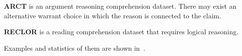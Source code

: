 \textbf{ARCT} is an argument reasoning comprehension dataset. 
There may exist an alternative warrant choice 
in which the reason is connected to the claim.

\textbf{RECLOR} is a reading comprehension dataset that requires logical reasoning.

Examples and statistics of them are shown in~. 

%
